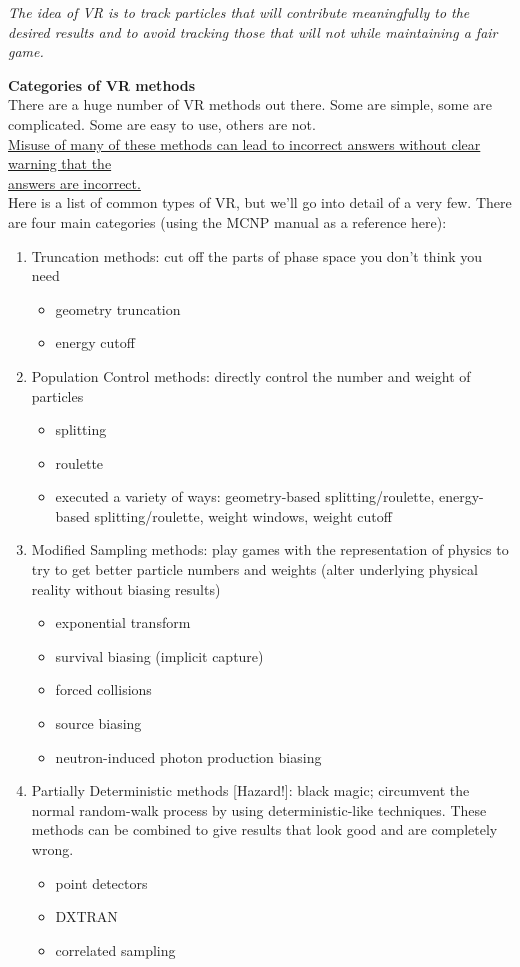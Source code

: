 \documentclass[12pt]{article}
\begin{document}
\textit{The idea of VR is to track particles that will contribute meaningfully to the desired results and to avoid tracking those that will not while maintaining a fair game.}

\textbf{Categories of VR methods}\\
There are a huge number of VR methods out there. Some are simple, some are complicated. Some are easy to use, others are not. \\
\underline{Misuse of many of these methods can lead to incorrect answers without clear warning that the} \\\underline{answers are incorrect.}\\
Here is a list of common types of VR, but we'll go into detail of a very few. There are four main categories (using the MCNP manual as a reference here):
%
\begin{enumerate}
\item Truncation methods: cut off the parts of phase space you don't think you need
  \begin{itemize}
  \item geometry truncation
  \item energy cutoff
  \end{itemize}
  
\item Population Control methods: directly control the number and weight of particles
  \begin{itemize}
  \item splitting
  \item roulette
  \item executed a variety of ways: geometry-based splitting/roulette, energy-based splitting/roulette, weight windows, weight cutoff
  \end{itemize}

\item Modified Sampling methods: play games with the representation of physics to try to get better particle numbers and weights (alter underlying physical reality without biasing results)
  \begin{itemize}
  \item exponential transform
  \item survival biasing (implicit capture)
  \item forced collisions
  \item source biasing
  \item neutron-induced photon production biasing
  \end{itemize}

\item Partially Deterministic methods [Hazard!]: black magic; circumvent the normal random-walk process by using deterministic-like techniques. These methods can be combined to give results that look good and are completely wrong.
  \begin{itemize}
  \item point detectors
  \item DXTRAN
  \item correlated sampling
  \end{itemize}
\end{enumerate}
\end{document}
